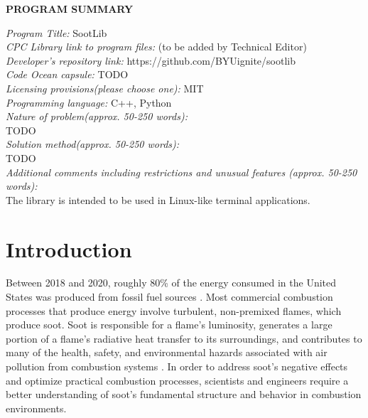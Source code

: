 \documentclass[preprint,12pt, a4paper]{elsarticle}
\begin{document}
\linenumbers


{\bf PROGRAM SUMMARY}

\begin{small}
\noindent
{\em Program Title:} SootLib                                         \\
{\em CPC Library link to program files:} (to be added by Technical Editor) \\
{\em Developer's repository link:} https://github.com/BYUignite/sootlib \\
{\em Code Ocean capsule:} TODO \\
{\em Licensing provisions(please choose one):} MIT \\
{\em Programming language:} C++, Python                                   \\
{\em Nature of problem(approx. 50-250 words):} \\
TODO \\
{\em Solution method(approx. 50-250 words):}\\
TODO \\ 
{\em Additional comments including restrictions and unusual features (approx. 50-250 words):}\\
The library is intended to be used in Linux-like terminal applications.  
   \\
\end{small}


\section{Introduction}
\label{s:intro}

Between 2018 and 2020, roughly 80\% of the energy consumed in the United States was produced from fossil fuel sources \cite{EIA_2021}. Most commercial combustion processes that produce energy involve turbulent, non-premixed flames, which produce soot. Soot is responsible for a flame's luminosity, generates a large portion of a flame's radiative heat transfer to its surroundings, and contributes to many of the health, safety, and environmental hazards associated with air pollution from combustion systems \cite{EPA_2009,EPA_2004}. In order to address soot's negative effects and optimize practical combustion processes, scientists and engineers require a better understanding of soot's fundamental structure and behavior in combustion environments. 
\end{document}
